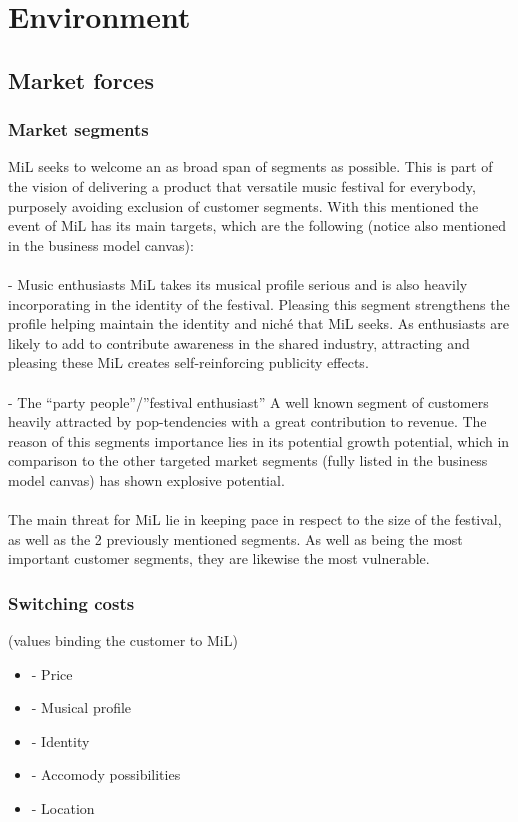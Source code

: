 \section{Environment} %
\subsection{Market forces}

\subsubsection{Market segments}

MiL seeks to welcome an as broad span of segments as possible. This is part of the vision of delivering a product that versatile music festival for everybody, purposely avoiding exclusion of customer segments. With this mentioned the event of MiL has its main targets, which are the following (notice also mentioned in the business model canvas):
\\ \\
- Music enthusiasts
MiL takes its musical profile serious and is also heavily incorporating in the identity of the festival.
Pleasing this segment strengthens the profile helping maintain the identity and niché that MiL seeks. As enthusiasts are likely to add to contribute awareness in the shared industry, attracting and pleasing these MiL creates self-reinforcing publicity effects.
\\ \\
- The “party people”/”festival enthusiast”
A well known segment of customers heavily attracted by pop-tendencies with a great contribution to revenue. The reason of this segments importance lies in its potential growth potential, which in comparison to the other  targeted market segments (fully listed in the business model canvas) has shown explosive potential. 
\\ \\
The main threat for MiL lie in keeping pace in respect to the size of the festival, as well as the 2 previously mentioned segments. As well as being the most important customer segments, they are likewise the most vulnerable.

\subsubsection{Switching costs}

(values binding the customer to MiL)
\begin{itemize}
	\item - Price
	\item - Musical profile
	\item - Identity
	\item - Accomody possibilities
	\item - Location
\end{itemize} 

